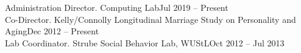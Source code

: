 \begin{samepage}\begin{rSection}{\textrm{Administration}}
Director. \R Computing Lab\hfill{Jul 2019 – Present}\\
Co-Director. Kelly/Connolly Longitudinal Marriage Study on Personality and Aging\hfill{Dec 2012 – Present}\\
Lab Coordinator. Strube Social Behavior Lab,  WUStL\hfill {Oct 2012 – Jul 2013}\end{rSection}\end{samepage}%
